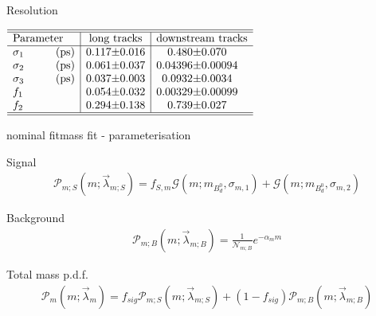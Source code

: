 \documentclass{beamer}
\newcommand{\Bd}{$B_d^0$}
\begin{document}
    \begin{frame}{Resolution}
    \begin{center}
    $\begin{array}{l | r@{\pm}l | r@{\pm}l}
\hline 
\hline
\text{Parameter} & \multicolumn{2}{c|}{\text{long tracks}} & \multicolumn{2}{c}{\text{downstream tracks}}\\
\hline
\sigma_{1}\hspace{1cm}(\text{ps}) &	0.117 & 0.016 & 0.480 & 0.070\\
\sigma_{2}\hspace{1cm}(\text{ps}) &	0.061 & 0.037 & 0.04396 & 0.00094\\
\sigma_{3}\hspace{1cm}(\text{ps}) &0.037 &	0.003 & 0.0932 & 0.0034 \\
f_{1} &0.054 & 0.032 & 0.00329 & 0.00099\\
f_{2} &0.294 & 0.138 & 0.739 & 0.027\\ \hline \hline
\end{array}$   
    \end{center}
    \end{frame}        	
	
	\begin{frame}{nominal fit}{mass fit - parameterisation}
	\begin{block}{Signal}
	\begin{align}
\mathcal{P}_{m;S}(m;\vec{\lambda}_{m;S}) = f_{S,m}\mathcal{G}(m;m_{\text{\Bd}},\sigma_{m,1}) + \mathcal{G}(m;m_{\text{\Bd}},\sigma_{m,2})
\end{align}
\end{block}
\begin{block}{Background}
\begin{align}
\mathcal{P}_{m;B}(m;\vec{\lambda}_{m;B}) = \frac{1}{\mathcal{N}_{m;B}}e^{-\alpha_m m}
\end{align}
\end{block}
\begin{block}{Total mass p.d.f.}
\begin{align}
\mathcal{P}_{m}(m;\vec{\lambda}_{m}) = f_{sig}\mathcal{P}_{m;S}(m;\vec{\lambda}_{m;S}) + (1-f_{sig})\mathcal{P}_{m;B}(m;\vec{\lambda}_{m;B})
\end{align}
\end{block}
	\end{frame}
	
\end{document}
